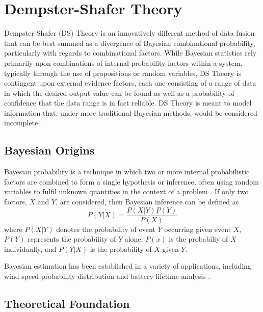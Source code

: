 \documentclass[12pt]{uthesis-v12}  %
\begin{document}
\section{Dempster-Shafer Theory}

Dempster-Shafer (DS) Theory is an innovatively different method of data fusion that can be best summed as a divergence of Bayesian combinational probability, particularly with regards to combinational factors. While Bayesian statistics rely primarily upon combinations of internal probability factors within a system, typically through the use of propositions or random variables, DS Theory is contingent upon external evidence factors, each one consisting of a range of data in which the desired output value can be found as well as a probability of confidence that the data range is in fact reliable. DS Theory is meant to model information that, under more traditional Bayesian methods, would be considered incomplete \cite{nguyen}.

\subsection{Bayesian Origins} 

Bayesian probability is a technique in which two or more internal probabilistic factors are combined to form a single hypothesis or inference, often using random variables to fulfil unknown quantities in the context of a problem \cite{rish}. If only two factors, $X$ and $Y$, are considered, then Bayesian inference can be defined as
\begin{equation}
P(Y|X)=\frac{P(X|Y)P(Y)}{P(X)}
\label{bayes1}
\end{equation}
where $P(X|Y)$ denotes the probability of event $Y$ occurring given event $X$, $P(Y)$ represents the probability of $Y$ alone, $P(x)$ is the probabiliy of $X$ individually, and $P(Y|X)$ is the probability of $X$ given $Y$. 

Bayesian estimation has been established in a variety of applications, including wind speed probability distribution \cite{chiodo1} and battery lifetime analysis \cite{chiodo2}. 

\subsection{Theoretical Foundation}
\end{document}
